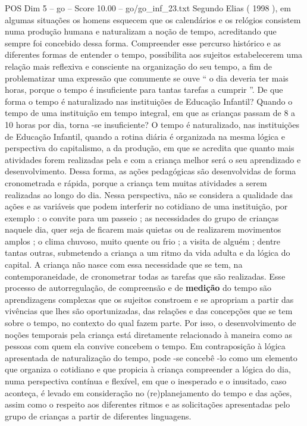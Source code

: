 \begin{textsample}{POS Dim 5 – go – Score 10.00 – go/go\_inf\_23.txt}
Segundo Elias ( 1998 ), em algumas situações os homens esquecem que os calendários e os relógios consistem numa produção humana e naturalizam a noção de tempo, acreditando que sempre foi concebido dessa forma.
Compreender esse percurso histórico e as diferentes formas de entender o tempo, possibilita aos sujeitos estabelecerem uma relação mais reflexiva e consciente na organização do seu tempo, a fim de problematizar uma expressão que comumente se ouve “ o dia deveria ter mais horas, porque o tempo é insuficiente para tantas tarefas a cumprir ”.
De que forma o tempo é naturalizado nas instituições de Educação Infantil?
Quando o tempo de uma instituição em tempo integral, em que as crianças passam de 8 a 10 horas por dia, torna -se insuficiente?
O tempo é naturalizado, nas instituições de Educação Infantil, quando a rotina diária é organizada na mesma lógica e perspectiva do capitalismo, a da produção, em que se acredita que quanto mais atividades forem realizadas pela e com a criança melhor será o seu aprendizado e desenvolvimento.
Dessa forma, as ações pedagógicas são desenvolvidas de forma cronometrada e rápida, porque a criança tem muitas atividades a serem realizadas ao longo do dia.
Nessa perspectiva, não se considera a qualidade das ações e as variáveis que podem interferir no cotidiano de uma instituição, por exemplo : o convite para um passeio ; as necessidades do grupo de crianças naquele dia, quer seja de ficarem mais quietas ou de realizarem movimentos amplos ; o clima chuvoso, muito quente ou frio ; a visita de alguém ; dentre tantas outras, submetendo a criança a um ritmo da vida adulta e da lógica do capital.
A criança não nasce com essa necessidade que se tem, na contemporaneidade, de cronometrar todas as tarefas que são realizadas.
Esse processo de autorregulação, de compreensão e de \textbf{medição} do tempo são aprendizagens complexas que os sujeitos constroem e se apropriam a partir das vivências que lhes são oportunizadas, das relações e das concepções que se tem sobre o tempo, no contexto do qual fazem parte.
Por isso, o desenvolvimento de noções temporais pela criança está diretamente relacionado à maneira como as pessoas com quem ela convive concebem o tempo.
Em contraposição à lógica apresentada de naturalização do tempo, pode -se concebê -lo como um elemento que organiza o cotidiano e que propicia à criança compreender a lógica do dia, numa perspectiva contínua e flexível, em que o inesperado e o inusitado, caso aconteça, é levado em consideração no (re)planejamento do tempo e das ações, assim como o respeito aos diferentes ritmos e as solicitações apresentadas pelo grupo de crianças a partir de diferentes linguagens.

\end{textsample}
